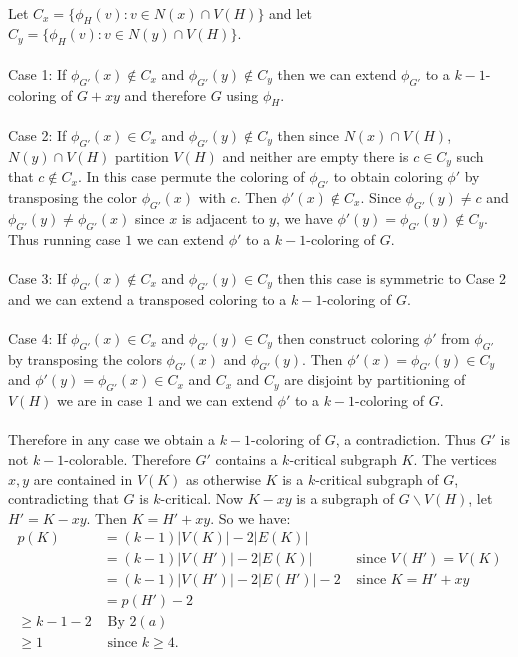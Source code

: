 \documentclass[letterpaper,12pt,oneside,onecolumn]{report}
\begin{document}
\paragraph{}
Let $C_x = \{\phi_H(v) : v \in N(x) \cap V(H) \}$ and let $C_y = \{\phi_H(v) : v \in N(y) \cap V(H) \}$. 
\paragraph{}Case 1: If $\phi_{G'}(x) \not\in C_x$ and $\phi_{G'}(y) \not\in C_y$ then we can extend $\phi_{G'}$ to a $k-1$-coloring of $G + xy$ and therefore $G$ using $\phi_H$. 
\paragraph{}Case 2: If $\phi_{G'}(x) \in C_x$ and $\phi_{G'}(y) \not \in C_y$ then since $N(x) \cap V(H)$, $N(y) \cap V(H)$ partition $V(H)$ and neither are empty there is $c \in C_y$ such that $c \not \in C_x$. In this case permute the coloring of $\phi_{G'}$ to obtain coloring $\phi'$ by transposing the color $\phi_{G'}(x)$ with $c$. Then $\phi'(x) \not \in C_x$. Since $\phi_{G'}(y) \neq c$ and $\phi_{G'}(y) \neq \phi_{G'}(x)$ since $x$ is adjacent to $y$, we have $\phi'(y) = \phi_{G'}(y) \not\in C_y$. Thus running case $1$ we can extend $\phi'$ to a $k-1$-coloring of $G$.
\paragraph{}Case 3: If $\phi_{G'}(x) \not\in C_x$ and $\phi_{G'}(y) \in C_y$ then this case is symmetric to Case 2 and we can extend a transposed coloring to a $k-1$-coloring of $G$.
\paragraph{} Case 4: If $\phi_{G'}(x) \in C_x$ and $\phi_{G'}(y) \in C_y$ then construct coloring $\phi'$ from $\phi_{G'}$ by transposing the colors $\phi_{G'}(x)$ and $\phi_{G'}(y)$. Then $\phi'(x) = \phi_{G'}(y) \in C_y$ and $\phi'(y) = \phi_{G'}(x) \in C_x$ and $C_x$ and $C_y$ are disjoint by partitioning of $V(H)$ we are in case $1$ and we can extend $\phi'$ to a $k-1$-coloring of $G$.
\paragraph{}
Therefore in any case we obtain a $k-1$-coloring of $G$, a contradiction. Thus $G'$ is not $k-1$-colorable. Therefore $G'$ contains a $k$-critical subgraph $K$. The vertices $x,y$ are contained in $V(K)$ as otherwise $K$ is a $k$-critical subgraph of $G$, contradicting that $G$ is $k$-critical. Now $K - xy$ is a subgraph of $G\backslash V(H)$, let $H' = K-xy$. Then $K = H' + xy$. So we have:
\begin{align*}
p(K) &= (k-1)|V(K)| - 2|E(K)| \\
&= (k-1)|V(H')| - 2|E(K)| &\text{ since $V(H') = V(K)$}\\
&= (k-1)|V(H')| -2|E(H')| - 2 &\text{ since $K = H' + xy$}\\
&= p(H') - 2 \\
\geq k-1 -2 &\text{ By $2(a)$}\\
\geq 1 &\text{ since $k \geq 4.$}
\end{align*}
\end{document}
